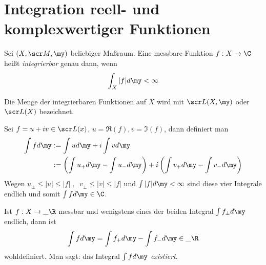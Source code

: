 \documentclass[a4paper,10pt]{scrbook}
\begin{document}
\section{Integration reell- und komplexwertiger Funktionen}

\begin{df*}
	Sei $(X,\scr M, \my)$ beliebiger Maßraum.
	Eine messbare Funktion $f:X\to \C$ heißt \emph{integrierbar} genau dann, wenn
	\[
		\int_X |f| d\my < \infty
	\]

	Die Menge der integrierbaren Funktionen auf $X$ wird mit $\scr L(X,\my)$ oder $\scr L(X)$ bezeichnet.

	Sei $f=u +iv \in \scr L(x)$, $u = \Re(f), v=\Im(f)$, dann definiert man
	\begin{align*}
		\int fd\my &:= \int ud\my + i\int vd\my\\
		&:= \left(\int u_+d\my - \int u_- d\my\right) + i\left(\int v_+ d\my - \int v_- d\my\right)
	\end{align*}
	Wegen $u_\pm \le |u| \le |f| \;,\;\; v_\pm \le |v| \le |f|$ und $\int |f|d\my < \infty$ sind diese vier Integrale endlich und somit $\int fd\my \in \C$.
	
	Ist $f:X\to \_\R$ messbar und wenigstens eines der beiden Integral $\int f_\pm d\my$ endlich, dann ist
	\[
		\int fd\my = \int f_+ d\my - \int f_- d\my \in \_\R
	\]
	wohldefiniert.
	Man sagt: das Integral $\int fd\my$ \emph{existiert}.
\end{df*}
\end{document}
